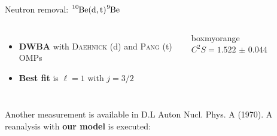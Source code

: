 \documentclass[sans,
frameno, %
mp,
usenames,dvipsnames, %
onlytextwidth, %
t,%
11pt]{beamer}
\newcommand{\iso}[2]{\ce{^{#1}#2}}
\begin{document}
\begin{frame}{Neutron removal: $\iso{10}{Be}(\textrm{d}, \textrm{t})\iso{9}{Be}$}
{\begin{figure}
\begin{minipage}[t]{0.48\linewidth}
            \end{minipage}
        \end{figure}
        \medskip
        \begin{columns}[c]
            {
                \begin{itemize}
                    \item \textbf{DWBA} with \textsc{Daehnick} (d) and \textsc{Pang} (t) OMPs
                    \item \textbf{Best fit} is $\ell = 1$ with $j = 3/2$
                \end{itemize}
            }\hfill
            {

                \begin{beamercolorbox}[sep=1ex, center, rounded=true]{boxmyorange}
                    $C^2S = \qty{1.522(44)}{}$
                \end{beamercolorbox}

            }
        \end{columns}

    }
    \only<+>
    {
        \addtocounter{framenumber}{1}
        Another measurement is available in {\small D.L Auton Nucl. Phys. A (1970)}. A reanalysis with \textbf{our model} is executed:

}
\end{frame}
\end{document}
